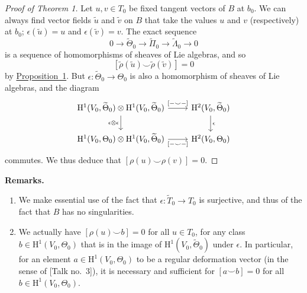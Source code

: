 \documentclass{article}
\newenvironment{rmenv}[1]
  {\phantomsection\par\medskip\noindent\textbf{#1.}\rmfamily}
  {\medskip}
\newcommand{\HH}{\mathrm{H}}
\newcommand{\oldpage}[1]{\marginpar{\footnotesize$\Big\vert$ \textit{p.~#1}}}
\begin{document}
\begin{proof}[Proof of Theorem 1]
  Let $u,v\in T_0$ be fixed tangent vectors of $B$ at $b_0$.
  We can always find vector fields $\widetilde{u}$ and $\widetilde{v}$ on $B$ that take the values $u$ and $v$ (respectively) at $b_0$;
  $\epsilon(\widetilde{u})=u$ and $\epsilon(\widetilde{v})=v$.
  The exact sequence
  \[
    0 \to
    \widetilde{\Theta}_0 \to
    \widetilde{\Pi}_0 \to
    \widetilde{\Lambda}_0 \to
    0
  \]
  is a sequence of homomorphisms of sheaves of Lie algebras, and so
  \[
    [\widetilde{\rho}(\widetilde{u})\smile\widetilde{\rho}(\widetilde{v})] = 0
  \]
  by \hyperref[proposition1]{Proposition~1}.
  But $\epsilon\colon\widetilde{\Theta}_0\to\Theta_0$ is also a homomorphism of sheaves of Lie algebras, and the diagram
  \[
    \begin{tikzcd}
      \HH^1(V_0,\widetilde{\Theta}_0)\otimes\HH^1(V_0,\widetilde{\Theta}_0) \rar["{[-\smile-]}"] \dar[swap,"\epsilon\otimes\epsilon"]
      & \HH^2(V_0,\widetilde{\Theta}_0) \dar["\epsilon"]
    \\\HH^1(V_0,\Theta_0)\otimes\HH^1(V_0,\widetilde{\Theta}_0) \rar[swap,"{[-\smile-]}"]
      & \HH^2(V_0,\Theta_0)
    \end{tikzcd}
  \]
  commutes.
  We thus deduce that $[\rho(u)\smile\rho(v)]=0$.
\end{proof}

\oldpage{4-05}
\begin{rmenv}{Remarks}
  \begin{enumerate}
    \item We make essential use of the fact that $\epsilon\colon\widetilde{T}_0\to T_0$ is surjective, and thus of the fact that $B$ has no singularities.
    \item We actually have $[\rho(u)\smile b]=0$ for all $u\in T_0$, for any class $b\in\HH^1(V_0,\Theta_0)$ that is in the image of $\HH^1(V_0,\widetilde{\Theta}_0)$ under $\epsilon$.
    In particular, for an element $a\in\HH^1(V_0,\Theta_0)$ to be a regular deformation vector (in the sense of [Talk no.~3]), it is necessary and sufficient for $[a\smile b]=0$ for all $b\in\HH^1(V_0,\Theta_0)$.
  \end{enumerate}
\end{rmenv}
\end{document}
